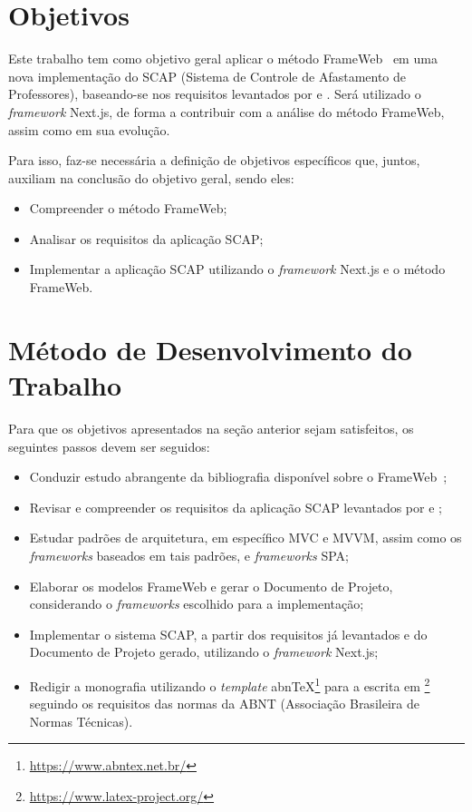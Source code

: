 \section{Objetivos}
\label{sec-intro-obj}

Este trabalho tem como objetivo geral aplicar o método FrameWeb~\cite{souza:2007} em uma nova implementação do SCAP (Sistema de Controle de Afastamento de Professores),
baseando-se nos requisitos levantados por  e . Será utilizado o \textit{framework} Next.js, de forma a contribuir com a análise do método FrameWeb, assim como em sua evolução.

Para isso, faz-se necessária a definição de objetivos específicos que, juntos, auxiliam na conclusão do objetivo geral, sendo eles:
\begin{itemize}
    \item Compreender o método FrameWeb;
    \item Analisar os requisitos da aplicação SCAP;
    \item Implementar a aplicação SCAP utilizando o \textit{framework} Next.js e o método FrameWeb.
\end{itemize}


\section{Método de Desenvolvimento do Trabalho}
\label{sec-intro-met}

Para que os objetivos apresentados na seção anterior sejam satisfeitos, os seguintes passos devem ser seguidos:

\begin{itemize}
    \item Conduzir estudo abrangente da bibliografia disponível sobre o FrameWeb~\cite{souza:2007,souza:2020};
    \item Revisar e compreender os requisitos da aplicação SCAP levantados por  e ;
    \item Estudar padrões de arquitetura, em específico MVC e MVVM, assim como os \textit{frameworks} baseados em tais padrões, e \textit{frameworks} SPA;
    \item Elaborar os modelos FrameWeb e gerar o Documento de Projeto, considerando o \textit{frameworks} escolhido para a implementação;
    \item Implementar o sistema SCAP, a partir dos requisitos já levantados e do Documento de Projeto gerado, utilizando o \textit{framework} Next.js;
    \item Redigir a monografia utilizando o \textit{template} abnTeX\footnote{\url{https://www.abntex.net.br/}} para a escrita em \latex\footnote{\url{https://www.latex-project.org/}} seguindo os requisitos das normas da ABNT (Associação Brasileira de Normas Técnicas).
\end{itemize}


